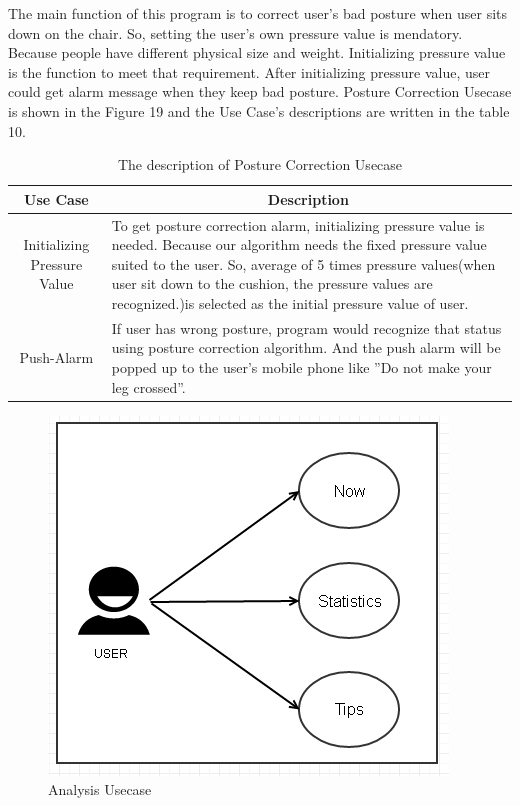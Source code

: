 \documentclass[conference]{IEEEtran}
\begin{document}
The main function of this program is to correct user's bad posture when user sits down on the chair. So, setting the user's own pressure value is mendatory. Because people have different physical size and weight. Initializing pressure value  is the function to meet that requirement. After initializing pressure value, user could get alarm message when they keep bad posture. Posture Correction Usecase is shown in the Figure 19 and the Use Case's descriptions are written in the table 10.

\begin{table}[h]
{\renewcommand\arraystretch{1.25}
\caption{The description of Posture Correction Usecase}
\begin{tabular}{|c|l|l|} \hline
Use Case & \multicolumn{2}{c|}{Description} \\ \hline\hline
Initializing Pressure Value& \multicolumn{2}{p{4.5cm}|}{\raggedright To get posture correction alarm, initializing pressure value is needed. Because our algorithm needs the fixed pressure value suited to the user. So,  average of 5 times pressure values(when user sit down to the cushion, the pressure values are recognized.)is selected as the initial pressure value of user.} \\ \hline
Push-Alarm& \multicolumn{2}{p{4.5cm}|}{\raggedright If user has wrong posture, program would recognize that status using posture correction algorithm. And the push alarm will be popped up to the user's mobile phone like ''Do not make your leg crossed''.} \\ \hline
\end{tabular}}
\end{table}


\begin{figure}[H]
\begin{center}
    \includegraphics[scale=0.8]{img_21.png}
    \caption{Analysis Usecase} 
\end{center}
\end{figure}
               
\end{document}
